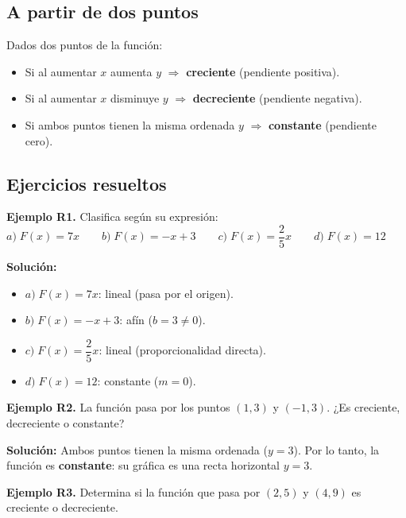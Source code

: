 \documentclass[12pt, letterpaper]{article}
\begin{document}
\subsection{A partir de dos puntos}

\begin{cuadroteoria}
  Dados dos puntos de la función:
  \begin{itemize}[leftmargin=*]
    \item Si al aumentar $x$ aumenta $y$ $\Rightarrow$ \textbf{creciente} (pendiente positiva).
    \item Si al aumentar $x$ disminuye $y$ $\Rightarrow$ \textbf{decreciente} (pendiente negativa).
    \item Si ambos puntos tienen la misma ordenada $y$ $\Rightarrow$ \textbf{constante} (pendiente cero).
  \end{itemize}
\end{cuadroteoria}

\subsection{Ejercicios resueltos}

\textbf{Ejemplo R1.} Clasifica según su expresión: $a) \; F(x) = 7x \qquad b) \; F(x) = -x + 3 \qquad c) \; F(x) = \dfrac{2}{5}x \qquad d) \; F(x) = 12$

\begin{cuadrosolucion}
  \textbf{Solución:}
  \begin{itemize}
    \item $a) \; F(x) = 7x$: lineal (pasa por el origen).
    \item $b) \; F(x) = -x + 3$: afín ($b = 3 \neq 0$).
    \item $c) \; F(x) = \dfrac{2}{5}x$: lineal (proporcionalidad directa).
    \item $d) \; F(x) = 12$: constante ($m = 0$).
  \end{itemize}
\end{cuadrosolucion}

\textbf{Ejemplo R2.} La función pasa por los puntos $(1, 3)$ y $(-1, 3)$. ¿Es creciente, decreciente o constante?

\begin{cuadrosolucion}
  \textbf{Solución:} Ambos puntos tienen la misma ordenada ($y = 3$). Por lo tanto, la función es \textbf{constante}: su gráfica es una recta horizontal $y = 3$.
\end{cuadrosolucion}

\textbf{Ejemplo R3.} Determina si la función que pasa por $(2, 5)$ y $(4, 9)$ es creciente o decreciente.
\end{document}
